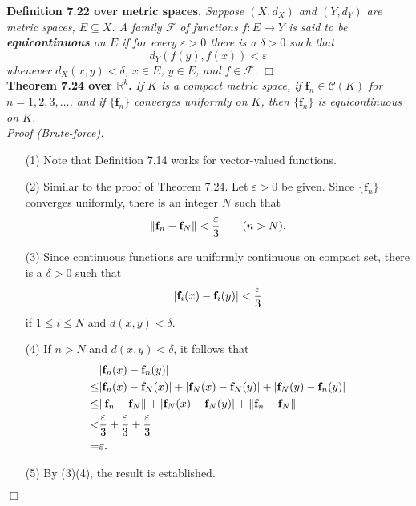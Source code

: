 \documentclass{article}
\begin{document}
\textbf{Definition 7.22 over metric spaces.}
\emph{Suppose $(X,d_X)$ and $(Y,d_Y)$ are metric spaces, $E \subseteq X$.
A family $\mathscr{F}$ of functions $f: E \to Y$ is
said to be \textbf{equicontinuous} on $E$
if for every $\varepsilon > 0$ there is a $\delta > 0$ such that
\[
  d_Y(f(y),f(x)) < \varepsilon
\]
whenever $d_X(x,y) < \delta$, $x \in E$, $y \in E$, and $f \in \mathscr{F}$.}
$\Box$ \\



\textbf{Theorem 7.24 over $\mathbb{R}^k$.}
\emph{If $K$ is a compact metric space,
if $\mathbf{f}_n \in \mathscr{C}(K)$ for $n=1,2,3,\ldots$,
and if $\{\mathbf{f}_n\}$ converges uniformly on $K$,
then $\{\mathbf{f}_n\}$ is equicontinuous on $K$.} \\

\emph{Proof (Brute-force).}
\begin{enumerate}
\item[(1)]
  Note that Definition 7.14 works for vector-valued functions.

\item[(2)]
  Similar to the proof of Theorem 7.24.
  Let $\varepsilon > 0$ be given.
  Since $\{\mathbf{f}_n\}$ converges uniformly, there is an integer $N$ such that
  \[
    \norm{ \mathbf{f}_n - \mathbf{f}_N } < \frac{\varepsilon}{3}
    \qquad
    (n > N).
  \]

\item[(3)]
  Since continuous functions are uniformly continuous on compact set,
  there is a $\delta > 0$ such that
  \[
    \abs{ \mathbf{f}_i(x) - \mathbf{f}_i(y) } < \frac{\varepsilon}{3}
  \]
  if $1 \leq i \leq N$ and $d(x,y) < \delta$.

\item[(4)]
  If $n > N$ and $d(x,y) < \delta$, it follows that
  \begin{align*}
    &\abs{\mathbf{f}_n(x)-\mathbf{f}_n(y)} \\
    \leq& \abs{\mathbf{f}_n(x)-\mathbf{f}_N(x)}
     + \abs{\mathbf{f}_N(x)-\mathbf{f}_N(y)}
     + \abs{\mathbf{f}_N(y)-\mathbf{f}_n(y)} \\
    \leq& \norm{ \mathbf{f}_n - \mathbf{f}_N }
     + \abs{\mathbf{f}_N(x)-\mathbf{f}_N(y)}
     + \norm{ \mathbf{f}_n - \mathbf{f}_N } \\
    <& \frac{\varepsilon}{3} + \frac{\varepsilon}{3} + \frac{\varepsilon}{3} \\
    =& \varepsilon.
  \end{align*}

\item[(5)]
By (3)(4), the result is established.
\end{enumerate}
$\Box$ \\
\end{document}
